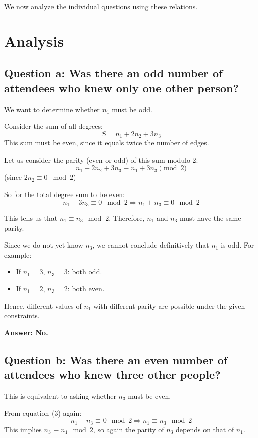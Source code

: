 \documentclass[12pt]{article}
\begin{document}
We now analyze the individual questions using these relations.

\section{Analysis}

\subsection{Question a: Was there an odd number of attendees who knew only one other person?}

We want to determine whether \( n_1 \) must be odd.

Consider the sum of all degrees:
\[
S = n_1 + 2n_2 + 3n_3
\]
This sum must be even, since it equals twice the number of edges.

Let us consider the parity (even or odd) of this sum modulo 2:
\[
n_1 + 2n_2 + 3n_3 \equiv n_1 + 3n_3 \pmod{2}
\]
(since \( 2n_2 \equiv 0 \mod 2 \))

So for the total degree sum to be even:
\[
n_1 + 3n_3 \equiv 0 \mod 2
\Rightarrow n_1 + n_3 \equiv 0 \mod 2 \tag{3}
\]

This tells us that \( n_1 \equiv n_3 \mod 2 \). Therefore, \( n_1 \) and \( n_3 \) must have the same parity.

Since we do not yet know \( n_3 \), we cannot conclude definitively that \( n_1 \) is odd. For example:
\begin{itemize}
    \item If \( n_1 = 3 \), \( n_3 = 3 \): both odd.
    \item If \( n_1 = 2 \), \( n_3 = 2 \): both even.
\end{itemize}

Hence, different values of \( n_1 \) with different parity are possible under the given constraints. 

\textbf{Answer: No.}

\subsection{Question b: Was there an even number of attendees who knew three other people?}

This is equivalent to asking whether \( n_3 \) must be even.

From equation (3) again:
\[
n_1 + n_3 \equiv 0 \mod 2 \Rightarrow n_1 \equiv n_3 \mod 2
\]
This implies \( n_3 \equiv n_1 \mod 2 \), so again the parity of \( n_3 \) depends on that of \( n_1 \).
\end{document}
